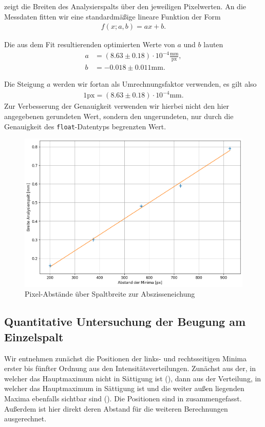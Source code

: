  zeigt die Breiten des Analysierspalts über den jeweiligen Pixelwerten. An die Messdaten fitten wir eine standardmäßige lineare Funktion der Form
\begin{align}
  f(x;a,b) = ax + b.
\end{align}

Die aus dem Fit resultierenden optimierten Werte von $a$ und $b$ lauten
\begin{align}
  a &= (8.63 \pm 0.18) \cdot 10^{-4} \frac{\si{\milli\meter}}{\mathrm{px}},\\[1em]
  b &= -0.018 \pm 0.011 \si{\milli\meter}.
\end{align}

Die Steigung $a$ werden wir fortan als Umrechnungsfaktor verwenden, es gilt also
\begin{align}
  1\mathrm{px} = (8.63 \pm 0.18) \cdot 10^{-4}\si{\milli\meter}.
\end{align}
Zur Verbesserung der Genauigkeit verwenden wir hierbei nicht den hier angegebenen gerundeten Wert, sondern den ungerundeten, nur durch die Genauigkeit des \texttt{float}-Datentyps begrenzten Wert.

\begin{figure}[H]
  \centering
  \includegraphics[width=.9\textwidth]{files/plots/2/abszisseneichung.png}
  \caption{Pixel-Abstände über Spaltbreite zur Abszisseneichung}
  \label{fig:abszisseneichung}
\end{figure}
\newpage
\subsection{Quantitative Untersuchung der Beugung am Einzelspalt}

Wir entnehmen zunächst die Positionen der links- und rechtsseitigen Minima erster bis fünfter Ordnung aus den Intensitätsverteilungen. Zunächst aus der, in welcher das Hauptmaximum nicht in Sättigung ist (), dann aus der Verteilung, in welcher das Hauptmaximum in Sättigung ist und die weiter außen liegenden Maxima ebenfalls sichtbar sind (). Die Positionen sind in  zusammengefasst. Außerdem ist hier direkt deren Abstand für die weiteren Berechnungen ausgerechnet.

